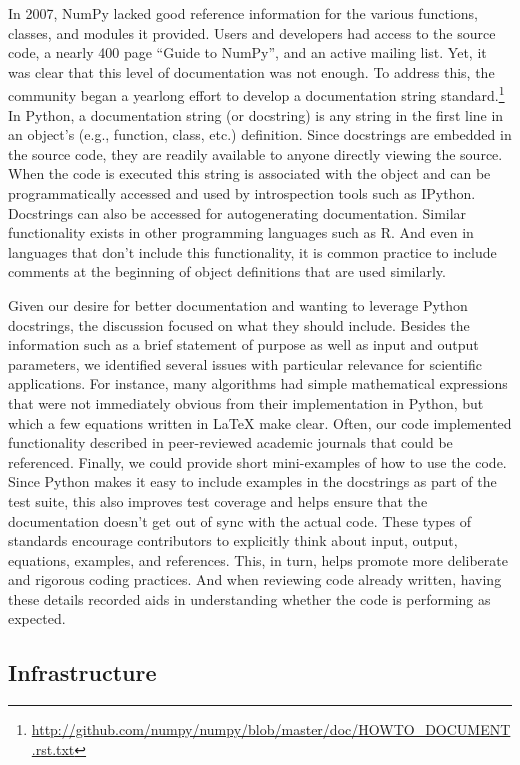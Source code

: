 \documentclass[ChapterTOCs,krantz2]{krantz} %
\begin{document}
In 2007, NumPy lacked good reference information for the various functions,
classes, and modules it provided. Users and developers had access to the source
code, a nearly 400 page ``Guide to NumPy'', and an active mailing list. Yet, it
was clear that this level of documentation was not enough. To address this, the
community began a yearlong effort to develop a documentation string
standard.\footnote{\url{http://github.com/numpy/numpy/blob/master/doc/HOWTO_DOCUMENT.rst.txt}}
In Python, a documentation string (or docstring) is any string in the first
line in an object's (e.g., function, class, etc.) definition. Since docstrings
are embedded in the source code, they are readily available to anyone directly
viewing the source. When the code is executed this string is associated with
the object and can be programmatically accessed and used by introspection tools
such as IPython.  Docstrings can also be accessed for autogenerating
documentation.  Similar functionality exists in other programming languages
such as R. And even in languages that don't include this functionality, it is
common practice to include comments at the beginning of object definitions that
are used similarly.

Given our desire for better documentation and wanting to leverage Python
docstrings, the discussion focused on what they should include. Besides the
information such as a brief statement of purpose as well as input and output
parameters, we identified several issues with particular relevance for
scientific applications.  For instance, many algorithms had simple mathematical
expressions that were not immediately obvious from their implementation in
Python, but which a few equations written in \LaTeX{} make clear.  Often, our
code implemented functionality described in peer-reviewed academic journals
that could be referenced. Finally, we could provide short mini-examples of how
to use the code. Since Python makes it easy to include examples in the
docstrings as part of the test suite, this also improves test coverage and
helps ensure that the documentation doesn't get out of sync with the actual
code. These types of standards encourage contributors to  explicitly think
about input, output, equations, examples, and references. This, in turn, helps
promote more deliberate and rigorous coding practices. And when reviewing code
already written, having these details recorded aids in understanding whether
the code is performing as expected.

\subsection{Infrastructure}
\end{document}
